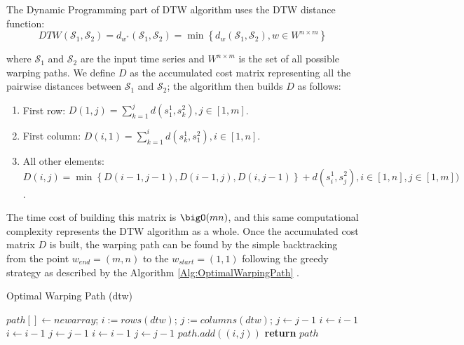 The Dynamic Programming part of DTW algorithm uses the DTW distance function:
\begin{equation}
DTW(\mathcal{S}_{1}, \mathcal{S}_{2}) =d_{w^{*}}(\mathcal{S}_{1}, \mathcal{S}_{2}) = \min\left\{d_{w}(\mathcal{S}_{1}, \mathcal{S}_{2}), w \in W^{n\times m} \right\}
\end{equation}

where $\mathcal{S}_{1}$ and $\mathcal{S}_{2}$ are the input time series and $W^{n\times m}$ is the set of all possible warping paths. We define $D$ as the accumulated cost matrix representing all the pairwise distances between $\mathcal{S}_{1}$ and $\mathcal{S}_{2}$; the algorithm then builds $D$ as follows:
\begin{enumerate}
    \item First row: $D(1, j) =\sum_{k=1}^{j}d(s^{1}_{1}, s^{2}_{k}), j \in [1, m]$.
    \item First column: $D(i,1) =\sum_{k=1}^{i}d(s^{1}_{k}, s^{2}_{1}), i \in [1, n]$.
    \item All other elements: $D(i, j) = \min \left\{ D(i-1, j-1), D(i-1, j), D(i, j-1)\right\} + d(s^{1}_{i}, s^{2}_{j}), i \in [1, n], j \in [1, m])$.
\end{enumerate}

The time cost of building this matrix is $\bigO(mn)$, and this same computational complexity represents the DTW algorithm as a whole. Once the accumulated cost matrix $D$ is built, the warping path can be found by the simple backtracking from the point $w_{end} = (m,n)$ to the $w_{start} = (1,1)$ following the greedy strategy as described by the Algorithm \ref{Alg:OptimalWarpingPath} \cite{Senin2008}.

\begin{algorithm}
\caption{Optimal Warping Path (dtw)} 
\label{Alg:OptimalWarpingPath}
\begin{algorithmic}[1]

\State $path[] \gets newarray$;
\State $i:=rows(dtw)$;
\State $j:=columns(dtw)$;
        \State $j \gets j-1$
        \State $i \gets i-1$
    \Else 
            \State $i \gets i-1$
                \State $j \gets j-1$
            \Else
                \State $i \gets i-1$
                \State $j \gets j-1$
        \EndIf
    \State $path.add((i, j))$
    \EndIf
\EndWhile
\State \textbf{return} $path$  
\end{algorithmic}
\end{algorithm}

